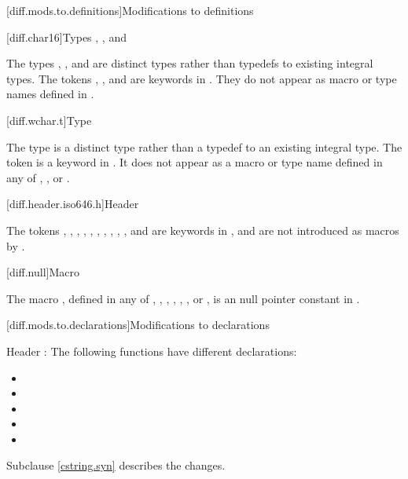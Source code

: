 [diff.mods.to.definitions]{Modifications to definitions}

[diff.char16]{Types , , and }

\pnum
The types , , and 
are distinct types rather than typedefs to existing integral types.
The tokens , , and 
are keywords in \Cpp{}.
They do not appear as macro or type names defined in
.

[diff.wchar.t]{Type }

\pnum
The type  is a distinct type rather than a typedef to an
existing integral type.
The token 
is a keyword in \Cpp{}.
It does not appear as a macro or type name defined in any of
,
,
or .

[diff.header.iso646.h]{Header }

\pnum
The tokens
,
,
,
,
,
,
,
,
,
,
and
are keywords in \Cpp{},
and are not introduced as macros
by .

[diff.null]{Macro }

\pnum
The macro
,
defined in any of
,
,
,
,
,
,
or ,
is an  null pointer constant in
\Cpp{}.

[diff.mods.to.declarations]{Modifications to declarations}

\pnum
Header :
The following functions have different declarations:

\begin{itemize}
\item {}
\item {}
\item {}
\item {}
\item {}
\end{itemize}

Subclause \ref{cstring.syn} describes the changes.


